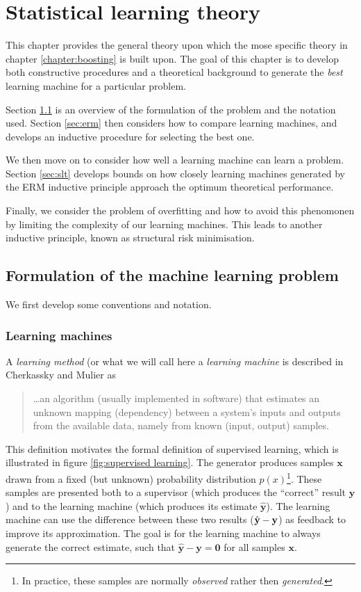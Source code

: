 
\chapter{Statistical learning theory}
\label{chapter:slt}

This chapter provides the general theory upon which the mose specific
theory in chapter \ref{chapter:boosting} is built upon.  The goal of
this chapter is to develop both constructive procedures and a
theoretical background to generate the \emph{best} learning machine
for a particular problem.

Section \ref{sec:formulation} is an overview of the formulation of the
problem and the notation used.  Section \ref{sec:erm} then considers
how to compare learning machines, and develops an inductive procedure
for selecting the best one.

We then move on to consider how well a learning machine can learn a
problem.  Section \ref{sec:slt} develops bounds on how closely
learning machines generated by the ERM inductive principle approach
the optimum theoretical performance.

Finally, we consider the problem of overfitting and how to avoid this
phenomonen by limiting the complexity of our learning machines.  This
leads to another inductive principle, known as structural risk
minimisation.

\section{Formulation of the machine learning problem}
\label{sec:formulation}

We first develop some conventions and notation.

\subsection{Learning machines}
A \emph{learning method} (or what we will call here a \emph{learning
machine} is described in Cherkassky and Mulier \cite{Cherkassky98} as
%
\begin{quote}
	\ldots an algorithm (usually implemented in software) that
	estimates an unknown mapping (dependency) between a system's
	inputs and outputs from the available data, namely from known
	(input, output) samples.
\end{quote}
%
This definition motivates the formal definition of supervised learning,
which is illustrated in figure \ref{fig:supervised learning}.  The generator
produces samples $\mathbf{x}$ drawn from a fixed (but unknown)
probability distribution $p(x)$\footnote{In practice, these samples
are normally \emph{observed} rather then \emph{generated}.}.
These samples are presented both to
a supervisor (which produces the ``correct'' result $\mathbf{y}$) and to the
learning machine (which produces its estimate $\hat{\mathbf{y}}$).  The
learning machine can use the difference between these two results
($\hat{\mathbf{y}} - \mathbf{y}$) as feedback to improve its approximation.  The goal
is for the learning machine to always generate the correct
estimate, such that $\mathbf{\hat{y} - y = 0}$ for all samples $\mathbf{x}$.

